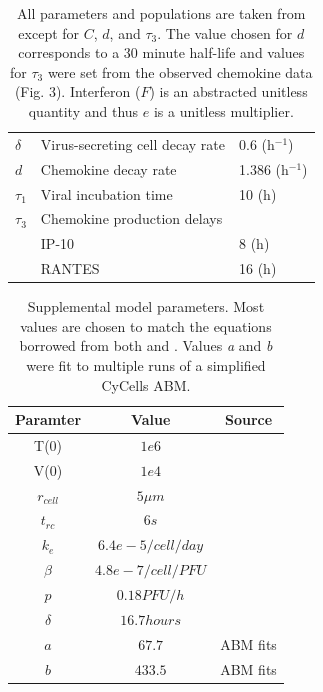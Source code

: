 \documentclass[10pt]{article}
\begin{document}
\begin{table}
\begin{center}
\begin{tabular}{|  l  l  l  |}
  $\delta$ & Virus-secreting cell decay rate & 0.6 (h$^{-1}$) \\
  $d$ & Chemokine decay rate & 1.386 (h$^{-1}$) \\
  $\tau_1$ & Viral incubation time & 10 (h) \\
  $\tau_3$ & Chemokine production delays & \\
    & \hspace{2em} IP-10 & 8 (h)\\
    & \hspace{2em} RANTES & 16 (h)\\
  \hline
\end{tabular}
\caption{All parameters and populations are taken from \cite{Mitchell2011} except for $C$, $d$, and $\tau_3$.  The value chosen for $d$ corresponds to a 30 minute half-life and values for $\tau_3$ were set from the observed chemokine data (Fig. 3).  Interferon ($F$) is an abstracted unitless quantity and thus $e$ is a unitless multiplier.}
\label{tab:dde}
\end{center}
\end{table}


\begin{table}[!ht]
\begin{center}
\begin{tabular}{ | c | c | c | }
  \hline                        
  Paramter & Value & Source \\
  \hline
  T(0) & $1e6$ & \cite{Mitchell2011} \\
  V(0) &  $1e4$ & \cite{Mitchell2011} \\
  $r_{cell}$ &  $5 \mu m$ & \cite{Miao2010} \\
  $t_{rc}$ & $6s$ & \cite{Peters1983} \\
  $k_e$ & $6.4e-5/cell/day$ & \cite{Miao2010} \\
  $\beta$ & $4.8e-7/cell/PFU$ & \cite{Mitchell2011} \\
  $p$ & $0.18 PFU/h$ & \cite{Mitchell2011} \\
  $\delta$ & $16.7 hours$ & \cite{Mitchell2011} \\
  $a$ & $67.7$ & ABM fits \\
  $b$ & $433.5$ & ABM fits \\
  \hline  
\end{tabular}
\caption{Supplemental model parameters.  Most values are chosen to match the equations borrowed from both \cite{Mitchell2011} and \cite{Miao2010}.  Values \textit{a} and \textit{b} were fit to multiple runs of a simplified CyCells ABM.}
\label{table:supplement}
\end{center}
\end{table}
\end{document}
